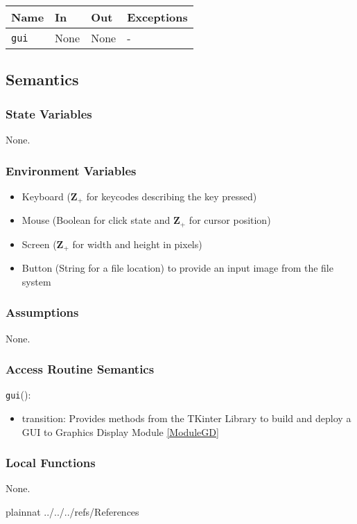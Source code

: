 \documentclass[12pt, titlepage]{article}
\def\code#1{\texttt{#1}}
\begin{document}
\begin{center}
\begin{tabular}{p{2cm} p{4cm} p{4cm} p{2cm}}
\hline
\textbf{Name} & \textbf{In} & \textbf{Out} & \textbf{Exceptions} \\
\hline
\code{gui} & None & None & - \\
\hline
\end{tabular}
\end{center}

\subsection{Semantics}

\subsubsection{State Variables}

None.

\subsubsection{Environment Variables}

\begin{itemize}
  \item Keyboard ($\mathbf{Z}_{+}$ for keycodes describing the key pressed)
  \item Mouse (Boolean for click state and  $\mathbf{Z}_{+}$ for cursor position)
  \item Screen ($\mathbf{Z}_{+}$ for width and height in pixels)
  \item Button (String for a file location) to provide an input image from the file system
\end{itemize}

\subsubsection{Assumptions}

None.

\subsubsection{Access Routine Semantics}

\noindent \code{gui}():
\begin{itemize}
\item transition: Provides methods from the TKinter Library to build and deploy a GUI to Graphics Display Module \ref{ModuleGD}
\end{itemize}

\subsubsection{Local Functions}

None.
  
\newpage

 {plainnat}
 {../../../refs/References}
\end{document}
